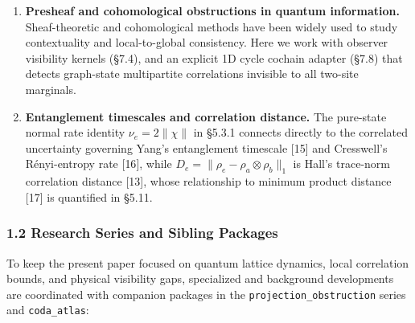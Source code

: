 \documentclass[
  11pt,
]{article}
\begin{document}
\begin{enumerate}
\item
  \textbf{Presheaf and cohomological obstructions in quantum information.} Sheaf-theoretic and cohomological methods have been widely used to study contextuality and local-to-global consistency. Here we work with observer visibility kernels (§7.4), and an explicit 1D cycle cochain adapter (§7.8) that detects graph-state multipartite correlations invisible to all two-site marginals.
\item
  \textbf{Entanglement timescales and correlation distance.} The pure-state normal rate identity \(\nu_e=2\lVert\chi\rVert\) in §5.3.1 connects directly to the correlated uncertainty governing Yang's entanglement timescale {[}15{]} and Cresswell's Rényi-entropy rate {[}16{]}, while \(D_e=\lVert\rho_e-\rho_a\otimes\rho_b\rVert_1\) is Hall's trace-norm correlation distance {[}13{]}, whose relationship to minimum product distance {[}17{]} is quantified in §5.11.
\end{enumerate}

\subsubsection{1.2 Research Series and Sibling Packages}\label{research-series-and-sibling-packages}

To keep the present paper focused on quantum lattice dynamics, local correlation bounds, and physical visibility gaps, specialized and background developments are coordinated with companion packages in the \texttt{projection\_obstruction} series and \texttt{coda\_atlas}:
\end{document}
